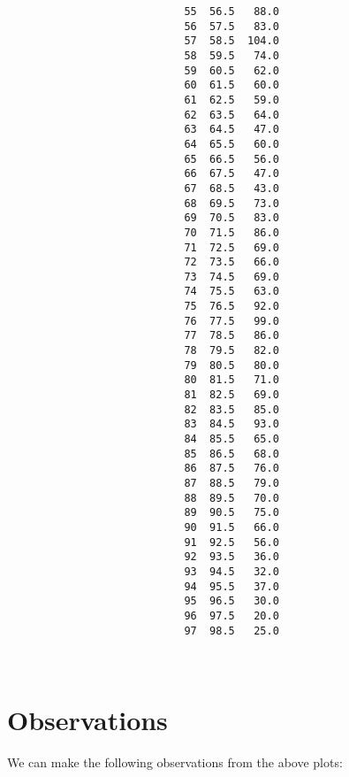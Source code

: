 \documentclass{article}
\begin{document}
\begin{verbatim}
                            55  56.5   88.0
                            56  57.5   83.0
                            57  58.5  104.0
                            58  59.5   74.0
                            59  60.5   62.0
                            60  61.5   60.0
                            61  62.5   59.0
                            62  63.5   64.0
                            63  64.5   47.0
                            64  65.5   60.0
                            65  66.5   56.0
                            66  67.5   47.0
                            67  68.5   43.0
                            68  69.5   73.0
                            69  70.5   83.0
                            70  71.5   86.0
                            71  72.5   69.0
                            72  73.5   66.0
                            73  74.5   69.0
                            74  75.5   63.0
                            75  76.5   92.0
                            76  77.5   99.0
                            77  78.5   86.0
                            78  79.5   82.0
                            79  80.5   80.0
                            80  81.5   71.0
                            81  82.5   69.0
                            82  83.5   85.0
                            83  84.5   93.0
                            84  85.5   65.0
                            85  86.5   68.0
                            86  87.5   76.0
                            87  88.5   79.0
                            88  89.5   70.0
                            89  90.5   75.0
                            90  91.5   66.0
                            91  92.5   56.0
                            92  93.5   36.0
                            93  94.5   32.0
                            94  95.5   37.0
                            95  96.5   30.0
                            96  97.5   20.0
                            97  98.5   25.0

                            
\end{verbatim}

\section{Observations}
		
We can make the following observations from the above plots:
\end{document}
